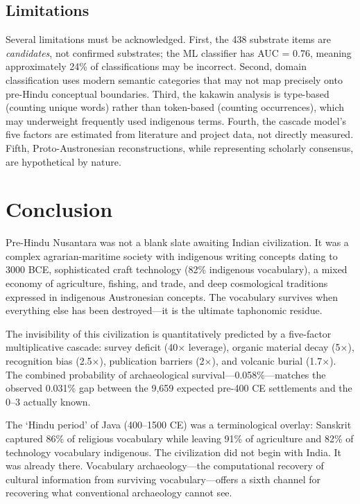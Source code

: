 \documentclass[12pt,a4paper]{article}
\begin{document}
\subsection{Limitations}

Several limitations must be acknowledged. First, the 438 substrate items are \textit{candidates}, not confirmed substrates; the ML classifier has AUC = 0.76, meaning approximately 24\% of classifications may be incorrect. Second, domain classification uses modern semantic categories that may not map precisely onto pre-Hindu conceptual boundaries. Third, the kakawin analysis is type-based (counting unique words) rather than token-based (counting occurrences), which may underweight frequently used indigenous terms. Fourth, the cascade model's five factors are estimated from literature and project data, not directly measured. Fifth, Proto-Austronesian reconstructions, while representing scholarly consensus, are hypothetical by nature.

\section{Conclusion}

Pre-Hindu Nusantara was not a blank slate awaiting Indian civilization. It was a complex agrarian-maritime society with indigenous writing concepts dating to 3000 BCE, sophisticated craft technology (82\% indigenous vocabulary), a mixed economy of agriculture, fishing, and trade, and deep cosmological traditions expressed in indigenous Austronesian concepts. The vocabulary survives when everything else has been destroyed---it is the ultimate taphonomic residue.

The invisibility of this civilization is quantitatively predicted by a five-factor multiplicative cascade: survey deficit (40$\times$ leverage), organic material decay (5$\times$), recognition bias (2.5$\times$), publication barriers (2$\times$), and volcanic burial (1.7$\times$). The combined probability of archaeological survival---0.058\%---matches the observed 0.031\% gap between the 9,659 expected pre-400 CE settlements and the 0--3 actually known.

The `Hindu period' of Java (400--1500 CE) was a terminological overlay: Sanskrit captured 86\% of religious vocabulary while leaving 91\% of agriculture and 82\% of technology vocabulary indigenous. The civilization did not begin with India. It was already there. Vocabulary archaeology---the computational recovery of cultural information from surviving vocabulary---offers a sixth channel for recovering what conventional archaeology cannot see.
\end{document}
